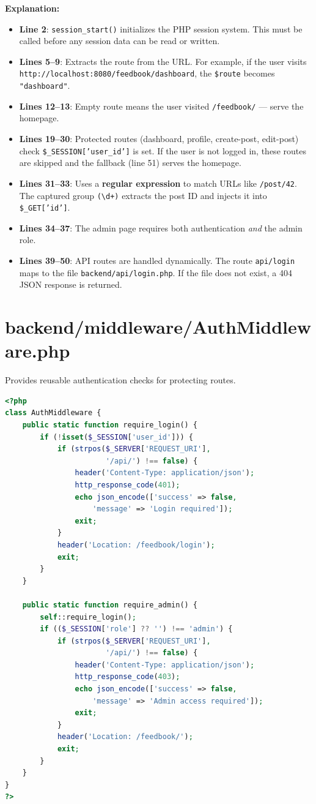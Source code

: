 \documentclass[12pt,a4paper]{report}
\begin{document}
\textbf{Explanation:}
\begin{itemize}
    \item \textbf{Line 2}: \texttt{session\_start()} initializes the PHP session system. This must be called before any session data can be read or written.
    \item \textbf{Lines 5--9}: Extracts the route from the URL. For example, if the user visits \texttt{http://localhost:8080/feedbook/dashboard}, the \texttt{\$route} becomes \texttt{"dashboard"}.
    \item \textbf{Lines 12--13}: Empty route means the user visited \texttt{/feedbook/} --- serve the homepage.
    \item \textbf{Lines 19--30}: Protected routes (dashboard, profile, create-post, edit-post) check \texttt{\$\_SESSION['user\_id']} is set. If the user is not logged in, these routes are skipped and the fallback (line 51) serves the homepage.
    \item \textbf{Lines 31--33}: Uses a \textbf{regular expression} to match URLs like \texttt{/post/42}. The captured group \texttt{(\textbackslash d+)} extracts the post ID and injects it into \texttt{\$\_GET['id']}.
    \item \textbf{Lines 34--37}: The admin page requires both authentication \textit{and} the admin role.
    \item \textbf{Lines 39--50}: API routes are handled dynamically. The route \texttt{api/login} maps to the file \texttt{backend/api/login.php}. If the file does not exist, a 404 JSON response is returned.
\end{itemize}

\section{backend/middleware/AuthMiddleware.php}
Provides reusable authentication checks for protecting routes.

\begin{lstlisting}[language=PHP]
<?php
class AuthMiddleware {
    public static function require_login() {
        if (!isset($_SESSION['user_id'])) {
            if (strpos($_SERVER['REQUEST_URI'],
                       '/api/') !== false) {
                header('Content-Type: application/json');
                http_response_code(401);
                echo json_encode(['success' => false,
                    'message' => 'Login required']);
                exit;
            }
            header('Location: /feedbook/login');
            exit;
        }
    }

    public static function require_admin() {
        self::require_login();
        if (($_SESSION['role'] ?? '') !== 'admin') {
            if (strpos($_SERVER['REQUEST_URI'],
                       '/api/') !== false) {
                header('Content-Type: application/json');
                http_response_code(403);
                echo json_encode(['success' => false,
                    'message' => 'Admin access required']);
                exit;
            }
            header('Location: /feedbook/');
            exit;
        }
    }
}
?>
\end{lstlisting}
\end{document}
